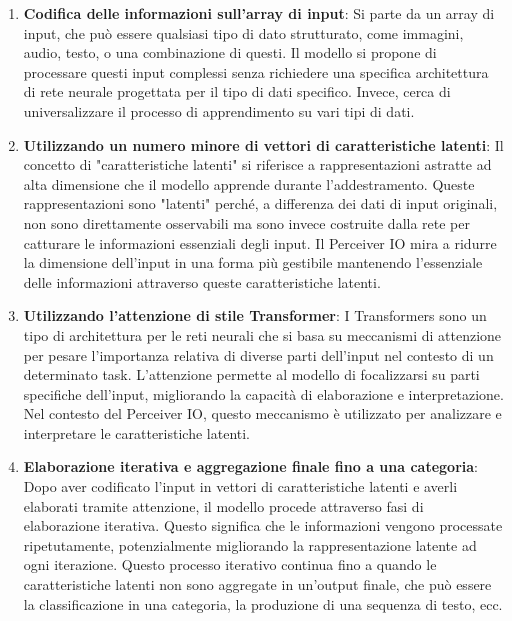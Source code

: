 \documentclass[
  11pt,
]{article}
\begin{document}
\begin{enumerate}
\def\labelenumi{\arabic{enumi}.}
\item
  \textbf{Codifica delle informazioni sull'array di
  input}: Si parte da un array di input, che può essere qualsiasi tipo
  di dato strutturato, come immagini, audio, testo, o una combinazione
  di questi. Il modello si propone di processare questi input complessi
  senza richiedere una specifica architettura di rete neurale progettata
  per il tipo di dati specifico. Invece, cerca di universalizzare il
  processo di apprendimento su vari tipi di dati.
\item
  \textbf{Utilizzando un numero minore di vettori di caratteristiche
  latenti}: Il concetto di "caratteristiche latenti" si riferisce a
  rappresentazioni astratte ad alta dimensione che il modello apprende
  durante l'addestramento. Queste rappresentazioni sono
  "latenti" perché, a differenza dei dati di input originali, non sono
  direttamente osservabili ma sono invece costruite dalla rete per
  catturare le informazioni essenziali degli input. Il Perceiver IO mira
  a ridurre la dimensione dell'input in una forma più
  gestibile mantenendo l'essenziale delle informazioni
  attraverso queste caratteristiche latenti.
\item
  \textbf{Utilizzando l'attenzione di stile
  Transformer}: I Transformers sono un tipo di architettura per le reti
  neurali che si basa su meccanismi di attenzione per pesare
  l'importanza relativa di diverse parti
  dell'input nel contesto di un determinato task.
  L'attenzione permette al modello di focalizzarsi su
  parti specifiche dell'input, migliorando la capacità
  di elaborazione e interpretazione. Nel contesto del Perceiver IO,
  questo meccanismo è utilizzato per analizzare e interpretare le
  caratteristiche latenti.
\item
  \textbf{Elaborazione iterativa e aggregazione finale fino a una
  categoria}: Dopo aver codificato l'input in vettori di
  caratteristiche latenti e averli elaborati tramite attenzione, il
  modello procede attraverso fasi di elaborazione iterativa. Questo
  significa che le informazioni vengono processate ripetutamente,
  potenzialmente migliorando la rappresentazione latente ad ogni
  iterazione. Questo processo iterativo continua fino a quando le
  caratteristiche latenti non sono aggregate in
  un'output finale, che può essere la classificazione in
  una categoria, la produzione di una sequenza di testo, ecc.
\end{enumerate}
\end{document}
